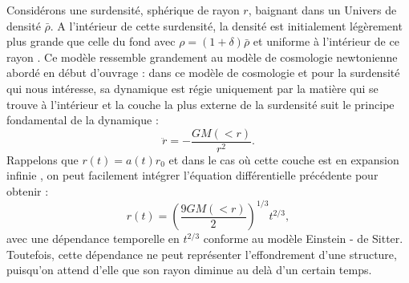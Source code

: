 Considérons une surdensité, sphérique de rayon $r$, baignant dans un Univers de densité $\bar \rho$. A l'intérieur de cette surdensité, la densité est initialement légèrement plus grande que celle du fond avec $\rho = (1+\delta) \bar \rho$ et uniforme à l'intérieur de ce rayon .  Ce modèle ressemble grandement au modèle de cosmologie newtonienne  abordé en début d'ouvrage : dans ce modèle de cosmologie et pour la surdensité qui nous intéresse, sa dynamique est régie uniquement par la matière qui se trouve à l'intérieur et la couche la plus externe de la surdensité suit le principe fondamental de la dynamique :
\begin{equation}
\ddot r = -\frac{GM(<r)}{r^2}.
\end{equation}
Rappelons que $r(t)=a(t)r_0$ et dans le cas où cette couche est en expansion infinie , on peut facilement intégrer l'équation différentielle précédente pour obtenir :
\begin{equation}
r(t)=\left(\frac{9GM(<r)}{2}\right)^{1/3} t^{2/3},
\end{equation} 
avec une dépendance temporelle en $t^{2/3}$ conforme au modèle Einstein - de Sitter. Toutefois, cette dépendance ne peut représenter l'effondrement d'une structure, puisqu'on attend d'elle que son rayon diminue au delà d'un certain temps.


